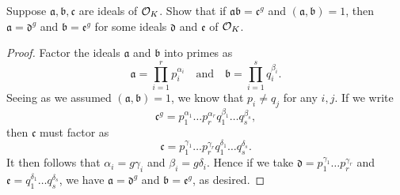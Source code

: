 \documentclass[10pt]{amsart}
\begin{document}
\begin{thm}
  \label{Ex3}
  \newcommand{\A}{\mathfrak{a}}
  \newcommand{\B}{\mathfrak{b}}
  \renewcommand{\C}{\mathfrak{c}}
  \newcommand{\D}{\mathfrak{d}}
  \newcommand{\E}{\mathfrak{e}}
  Suppose $\A,\B,\C$ are ideals of $\mathcal{O}_K$.
  Show that if $\A\B = \C^g$ and $(\A,\B) = 1$, then $\A = \D^g$ and $\B = \E^g$ for some ideals $\D$ and $\E$ of $\mathcal{O}_K$.
  \begin{proof}
    Factor the ideals $\A$ and $\B$ into primes as 
    $$\A = \prod_{i=1}^r p_i^{\alpha_i} \quad \text{and} \quad \B = \prod_{i=1}^s q_i^{\beta_i}.$$
    Seeing as we assumed $(\A,\B) = 1$, we know that $p_i \not = q_j$ for any $i,j$.
    If we write
    $$\C^g = p_1^{\alpha_1}\ldots p_r^{\alpha_r}q_1^{\beta_1}\ldots q_s^{\beta_s},$$
    then $\C$ must factor as 
    $$\C = p_1^{\gamma_1} \ldots p_r^{\gamma_r}q_1^{\delta_1}\ldots q_s^{\delta_s}.$$
    It then follows that $\alpha_i = g\gamma_i$ and $\beta_i = g\delta_i$.
    Hence if we take $\D = p_1^{\gamma_1}\ldots p_r^{\gamma_r}$ and $\E = q_1^{\delta_1}\ldots q_s^{\delta_s}$, we have $\A = \D^g$ and $\B = \E^g$, as desired.
  \end{proof}
\end{thm}
\end{document}
